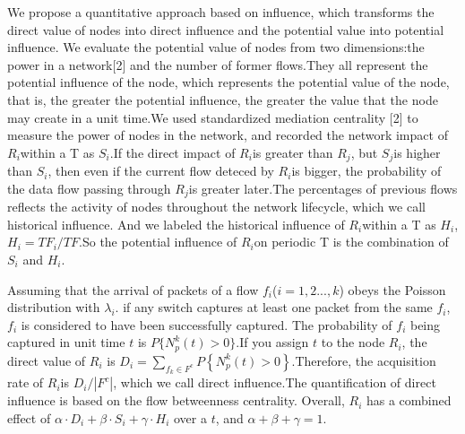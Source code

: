 \documentclass[conference,compsoc]{IEEEtran}
\begin{document}
We propose a quantitative approach based on influence, which transforms the direct value of nodes into direct influence and the potential value into potential influence. We evaluate the potential value of nodes from two dimensions:the power in a network[2] and the number of former flows.They all represent the potential influence of the node, which represents the potential value of the node, that is, the greater the potential influence, the greater the value that the node may create in a unit time.We used standardized mediation centrality [2] to measure the power of nodes in the network, and recorded the network impact of $R_i$within a T as $S_i$.If the direct impact of $R_i$is greater than $R_j$, but $S_j$is higher than $S_i$, then even if the current flow deteced by $R_i$is bigger, the probability of the data flow passing through $R_j$is greater later.The percentages of previous flows  reflects the activity of nodes throughout the network lifecycle, which we call historical influence. And we labeled the historical influence of $R_i$within a T as $H_i $, $H_i = TF_i/TF$.So the potential influence of $R_i$on periodic T is the combination of $S_i$ and $H_i$.

Assuming that the arrival of packets of a flow $f_i$($i=1,2...,k$) obeys the Poisson distribution with ${\lambda_{i}}$. if any switch captures at least one packet from the same $f_i$, $f_i$ is considered to have been successfully captured. The probability of $f_i$ being captured in unit time $t$ is $P\{N_p^k (t) >0\}$.If you assign $t$ to the node $R_i$, the direct value of $R_i$ is $D_i= \sum\limits_{{{f}_{k}}\in {{F}^{c}}}{P\left\{ N_{p}^{k}\left( t \right)>0 \right\}}$.Therefore, the acquisition rate of $R_i$is $D_i/|F^c|$, which we call direct influence.The quantification of direct influence is based on the flow betweenness centrality. Overall, $R_i$ has a combined effect of $\alpha \cdot {{D}_{i}}+\beta \cdot {{S}_{i}}+\gamma \cdot {{H}_{i}}$ over a $t$, and $\alpha +\beta +\gamma  = 1$.
\end{document}
